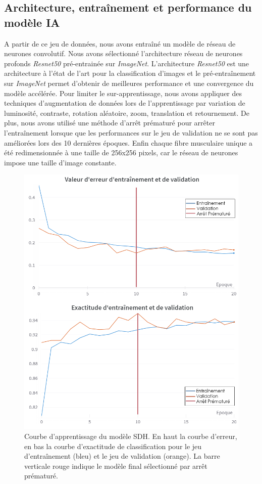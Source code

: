 \subsection{Architecture, entraînement et performance du modèle IA}
A partir de ce jeu de données, nous avons entraîné un modèle de réseau de neurones convolutif. Nous avons sélectionné l'architecture réseau de neurones profonds \textit{Resnet50} pré-entrainée sur \textit{ImageNet}. L'architecture \textit{Resnet50} est une architecture à l'état de l'art pour la classification d'images et le pré-entraînement sur \textit{ImageNet} permet d'obtenir de meilleures performance et une convergence du modèle accélérée. Pour limiter le sur-apprentissage, nous avons appliquer des techniques d'augmentation de données lors de l'apprentissage par variation de luminosité, contraste, rotation aléatoire, zoom, translation et retournement. De plus, nous avons utilisé une méthode d'arrêt prématuré pour arrêter l'entraînement lorsque que les performances sur le jeu de validation ne se sont pas améliorées lors des 10 dernières époques. Enfin chaque fibre musculaire unique a été redimensionnée à une taille de 256x256 pixels, car le réseau de neurones impose une taille d'image constante.
\begin{figure}[htbp]
 \centering
 \includegraphics[width=1\textwidth]{figures/training_sdh.png}
 \caption[Courbe d'apprentissage du modèle SDH]{Courbe d'apprentissage du modèle SDH. En haut la courbe d'erreur, en bas la courbe d'exactitude de classification pour le jeu d'entraînement (bleu) et le jeu de validation (orange). La barre verticale rouge indique le modèle final sélectionné par arrêt prématuré.}
 \label{fig:sdh_train}
\end{figure}

